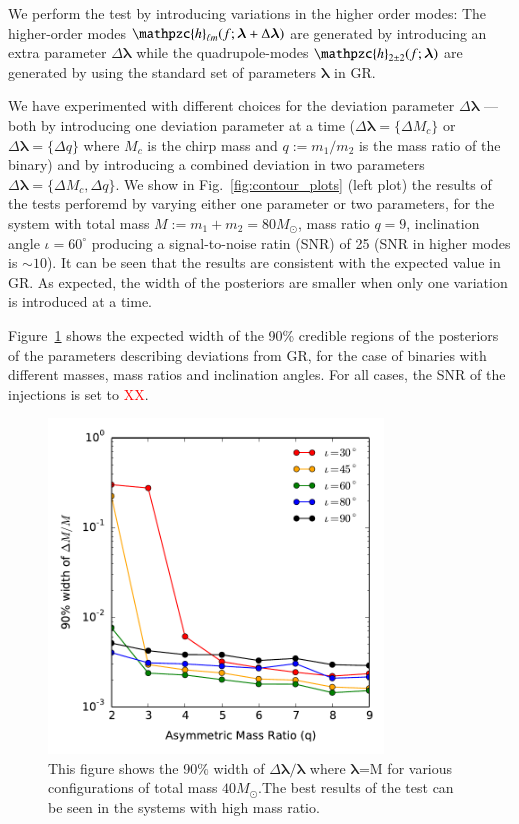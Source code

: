 \documentclass[prl,preprintnumbers,twocolumn,eqsecnum,floatfix,a4paper,nofootinbib,superscriptaddress]{revtex4}
\newcommand{\red}[1]{\textcolor{red}{#1}}
\newcommand{\h}{\mathpzc{h}}
\newcommand{\hlm}{\mathpzc{h}_{\ell m}}
\newcommand{\blambda}{\bm{\lambda}}
\begin{document}
We perform the test by introducing variations in the higher order modes: The higher-order modes $\hlm(f; \blambda+\Delta\blambda)$ are generated by introducing an extra parameter $\Delta\blambda$ while the quadrupole-modes $\h_{2\pm2}(f; \blambda)$ are generated by using the standard set of parameters $\blambda$ in GR. 

 We have experimented with different choices for the deviation parameter $\Delta\blambda$ --- both by introducing one deviation parameter at a time ($\Delta\blambda = \{\Delta M_c\}$ or $\Delta\blambda = \{\Delta q\}$ where $M_c$ is the chirp mass and $q := m_1/m_2$ is the mass ratio of the binary) and by introducing a combined deviation in two parameters $\Delta \blambda = \{\Delta M_c, \Delta q\}$. We show in Fig.~\ref{fig:contour_plots} (left plot) the results of the tests perforemd by varying either one parameter or two parameters, for the system with total mass $M := m_1 + m_2 = 80M_{\odot}$, mass ratio $q=9$, inclination angle $ {\iota}=60^{\circ} $ producing a signal-to-noise ratin  (SNR)  of 25 (SNR in higher modes is $\sim 10$). It can be seen that the results are consistent with the expected value in GR. As expected, the width of the posteriors are smaller when only one variation is introduced at a time. 

Figure~\ref{fig:dMc_dq_posteriors_gr} shows the expected width of the 90\% credible regions of the posteriors of the parameters describing deviations from GR, for the case of binaries with different masses, mass ratios and inclination angles. For all cases, the SNR of the injections is set to \red{XX}.  

\begin{figure}[h]
	\includegraphics*[width=3.5in]{figs/fig3.pdf}
	\caption{This figure shows the 90$\%$ width of $\Delta \blambda/\blambda$ where $\blambda$=M for various configurations of total mass $40M_{\odot}$.The best results of the test can be seen in the systems with high mass ratio.}
	\label{fig:dMc_dq_posteriors_gr}
\end{figure}
\end{document}
